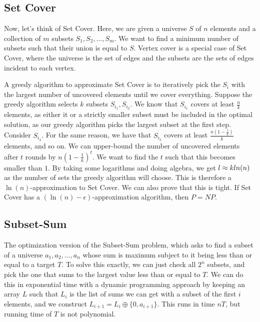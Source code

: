 \documentclass[twoside]{article}
\begin{document}
\subsection*{Set Cover}

Now, let's think of Set Cover.  Here, we are given a universe $S$ of $n$ elements and a collection of $m$ subsets $S_1,S_2,\dots, S_m$.  We want to find a minimum number of subsets such that their union is equal to $S$.  Vertex cover is a special case of Set Cover, where the universe is the set of edges and the subsets are the sets of edges incident to each vertex.

A greedy algorithm to approximate Set Cover is to iteratively pick the $S_i$ with the largest number of uncovered elements until we cover everything.  Suppose the greedy algorithm selects $k$ subsets $S_{i_1},S_{i_2}$.  We know that $S_{i_1}$ covers at least $\frac{n}{k}$ elements, as either it or a strictly smaller subset must be included in the optimal solution, as our greedy algorithm picks the largest subset at the first step.  Consider $S_{i_2}$.  For the same reason, we have that $S_{i_2}$ covers at least $\frac{n(1-\frac{1}{k})}{k}$ elements, and so on.  We can upper-bound the number of uncovered elements after $t$ rounds by $n(1-\frac{1}{k})^t$.  We want to find the $t$ such that this becomes smaller than $1$.  By taking some logarithms and doing algebra, we get $l\approx k\\ln(n)$ as the number of sets the greedy algorithm will choose.  This is therefore a $\ln(n)$-approximation to Set Cover.  We can also prove that this is tight.  If Set Cover has a $(\ln(n)-\epsilon)$-approximation algorithm, then $P=NP$.

\subsection*{Subset-Sum}

The optimization version of the Subset-Sum problem, which asks to find a subset of a universe $a_1,a_2,\dots,a_n$ whose sum is maximum subject to it being less than or equal to a target $T$.  To solve this exactly, we can just check all $2^n$ subsets, and pick the one that sums to the largest value less than or equal to $T$.  We can do this in exponential time with a dynamic programming approach by keeping an array $L$ such that $L_i$ is the list of sums we can get with a subset of the first $i$ elements, and we construct $L_{i+1}=L_i \oplus \{0,a_{i+1}\}$.  This runs in time $nT$, but running time of $T$ is not polynomial.
\end{document}
